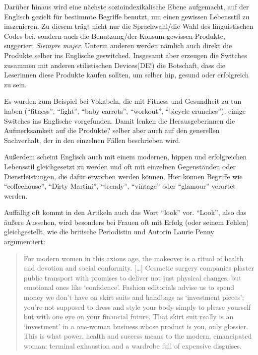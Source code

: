 Darüber hinaus wird eine nächste sozioindexikalische Ebene aufgemacht, auf der Englisch gezielt für bestimmte Begriffe benutzt, um einen gewissen Lebensstil zu inszenieren.
Zu diesem trägt nicht nur die Sprachwahl/die Wahl des linguistischen Codes bei, sondern auch die Benutzung/der Konsum gewissen Produkte, suggeriert \textit{Siempre mujer}.
Unterm anderen werden nämlich auch direkt die Produkte selber ins Englische geswitched.
Insgesamt aber erzeugen die Switches zusammen mit anderen stilistischen Devices(DE!) die Botschaft, dass die Leserinnen diese Produkte kaufen sollten, um selber hip, gesund oder erfolgreich zu sein.


Es wurden zum Beispiel bei Vokabeln, die mit Fitness und Gesundheit zu tun haben (``fitness'', ``light'', ``baby carrots'', ``workout'', ``bicycle crunches''), einige Switches ins Englische vorgefunden.
Damit lenken die Herausgeberinnen die Aufmerksamkeit auf die Produkte? selber aber auch auf den generellen Sachverhalt, der in den einzelnen Fällen beschrieben wird.

Außerdem scheint Englisch auch mit einem modernen, hippen und erfolgreichen Lebensstil gleichgesetzt zu werden und oft mit einzelnen Gegenständen oder Dienstleistungen, die dafür erworben werden können.
Hier können Begriffe wie ``coffeehouse'', ``Dirty Martini'', ``trendy'', ``vintage'' oder ``glamour'' verortet werden.



Auffällig oft kommt in den Artikeln auch das Wort ``look'' vor.
``Look'', also das äußere Aussehen, wird besonders bei Frauen oft mit Erfolg (oder seinem Fehlen) gleichgestellt, wie die britische Periodistin und Autorin Laurie Penny argumentiert:

\begin{quote}
For modern women in this axious age, the makeover is a ritual of health and devotion and social conformity.
[\ldots]
Cosmetic surgery companies plaster public transport with promises to deliver not just physical changes, but emotional ones like `confidence'.
Fashion editorials advise us to spend money we don't have on skirt suits and handbags as `investment pieces'; you're not supposed to dress and style your body simply to please yourself but with one eye on your financial future.
That skirt suit really is an `investment' in a one-woman business whose product is you, only glossier.
This is what power, health and success means to the modern, emancipated woman: terminal exhaustion and a wardrobe full of expensive disguises.~\cite[p.41-42]{Penny14}
\end{quote}


